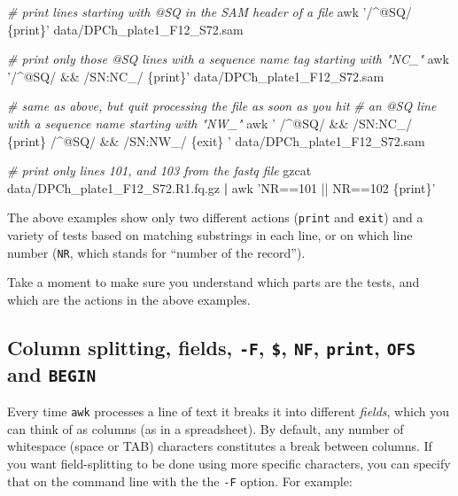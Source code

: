 \documentclass[]{krantz}
\makeatletter
\newenvironment{Shaded}{\begin{snugshade}}{\end{snugshade}}
\newcommand{\CommentTok}[1]{\textcolor[rgb]{0.37,0.37,0.37}{\textit{#1}}}
\newcommand{\ExtensionTok}[1]{#1}
\newcommand{\FunctionTok}[1]{\textcolor[rgb]{0,0,0}{#1}}
\newcommand{\KeywordTok}[1]{\textcolor[rgb]{0.27,0.27,0.27}{\textbf{#1}}}
\newcommand{\NormalTok}[1]{#1}
\newcommand{\StringTok}[1]{\textcolor[rgb]{0.5,0.5,0.5}{#1}}
\newenvironment{kframe}{%
\medskip{}
\setlength{\fboxsep}{.8em}
 \def\at@end@of@kframe{}%
 \ifinner\ifhmode%
  \def\at@end@of@kframe{\end{minipage}}%
  \begin{minipage}{\columnwidth}%
 \fi\fi%
 \def\FrameCommand##1{\hskip\@totalleftmargin \hskip-\fboxsep
 \colorbox{shadecolor}{##1}\hskip-\fboxsep
     \hskip-\linewidth \hskip-\@totalleftmargin \hskip\columnwidth}%
 \MakeFramed {\advance\hsize-\width
   \@totalleftmargin\z@ \linewidth\hsize
   \@setminipage}}%
 {\par\unskip\endMakeFramed%
 \at@end@of@kframe}
\renewenvironment{Shaded}{\begin{kframe}}{\end{kframe}}
\makeatother
\begin{document}
\begin{Shaded}
\begin{Highlighting}[]
\CommentTok{# print lines starting with @SQ in the SAM header of a file}
\FunctionTok{awk} \StringTok{'/^@SQ/ \{print\}'}\NormalTok{ data/DPCh_plate1_F12_S72.sam}

\CommentTok{# print only those @SQ lines with a sequence name tag starting with "NC_"}
\FunctionTok{awk} \StringTok{'/^@SQ/ && /SN:NC_/ \{print\}'}\NormalTok{ data/DPCh_plate1_F12_S72.sam}

\CommentTok{# same as above, but quit processing the file as soon as you hit}
\CommentTok{# an @SQ line with a sequence name starting with "NW_"}
\FunctionTok{awk} \StringTok{'}
\StringTok{  /^@SQ/ && /SN:NC_/ \{print\}}
\StringTok{  /^@SQ/ && /SN:NW_/ \{exit\}  }
\StringTok{'}\NormalTok{ data/DPCh_plate1_F12_S72.sam}


\CommentTok{# print only lines 101, and 103 from the fastq file}
\ExtensionTok{gzcat}\NormalTok{ data/DPCh_plate1_F12_S72.R1.fq.gz }\KeywordTok{|} \FunctionTok{awk} \StringTok{'NR==101 || NR==102 \{print\}'}
\end{Highlighting}
\end{Shaded}

The above examples show only two different actions (\texttt{print} and \texttt{exit}) and
a variety of tests based on matching substrings in each line, or on which
line number (\texttt{NR}, which stands for ``number of the record'').

Take a moment to make sure you understand which parts are the tests, and which are the actions
in the above examples.

\hypertarget{column-splitting-fields--f-nf-print-ofs-and-begin}{%
\subsection{\texorpdfstring{Column splitting, fields, \texttt{-F}, \texttt{\$}, \texttt{NF}, \texttt{print}, \texttt{OFS} and \texttt{BEGIN}}{Column splitting, fields, -F, \$, NF, print, OFS and BEGIN}}\label{column-splitting-fields--f-nf-print-ofs-and-begin}}

Every time \texttt{awk} processes a line of text it breaks it into different \emph{fields}, which you
can think of as columns (as in a spreadsheet). By default, any number of whitespace (space or TAB)
characters constitutes a break between columns. If you want field-splitting to be done using
more specific characters, you can specify that on the command line with the the \texttt{-F} option.
For example:
\end{document}
